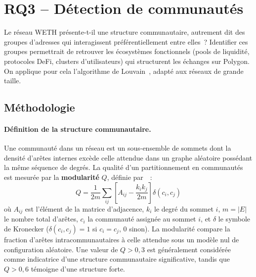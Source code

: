 
\section{RQ3 -- D\'etection de communaut\'es}
\label{sec:rq3}

Le r\'eseau WETH pr\'esente-t-il une structure communautaire, autrement dit des groupes d'adresses qui interagissent pr\'ef\'erentiellement entre elles~? Identifier ces groupes permettrait de retrouver les \'ecosyst\`emes fonctionnels (pools de liquidit\'e, protocoles DeFi, clusters d'utilisateurs) qui structurent les \'echanges sur Polygon. On applique pour cela l'algorithme de Louvain~\cite{blondel2008louvain}, adapt\'e aux r\'eseaux de grande taille.

\subsection{M\'ethodologie}
\label{sec:rq3_methodo}

\paragraph{D\'efinition de la structure communautaire.}
Une communaut\'e dans un r\'eseau est un sous-ensemble de sommets dont la densit\'e d'ar\^etes internes exc\`ede celle attendue dans un graphe al\'eatoire poss\'edant la m\^eme s\'equence de degr\'es. La qualit\'e d'un partitionnement en communaut\'es est mesur\'ee par la \textbf{modularit\'e} $Q$, d\'efinie par~\cite{newman2018networks}~:
\begin{equation}
Q = \frac{1}{2m} \sum_{ij} \left[ A_{ij} - \frac{k_i k_j}{2m} \right] \delta(c_i, c_j)
\label{eq:modularity}
\end{equation}
o\`u $A_{ij}$ est l'\'el\'ement de la matrice d'adjacence, $k_i$ le degr\'e du sommet $i$, $m = |E|$ le nombre total d'ar\^etes, $c_i$ la communaut\'e assign\'ee au sommet $i$, et $\delta$ le symbole de Kronecker ($\delta(c_i, c_j) = 1$ si $c_i = c_j$, $0$ sinon). La modularit\'e compare la fraction d'ar\^etes intracommunautaires \`a celle attendue sous un mod\`ele nul de configuration al\'eatoire. Une valeur de $Q > 0{,}3$ est g\'en\'eralement consid\'er\'ee comme indicatrice d'une structure communautaire significative, tandis que $Q > 0{,}6$ t\'emoigne d'une structure forte.

